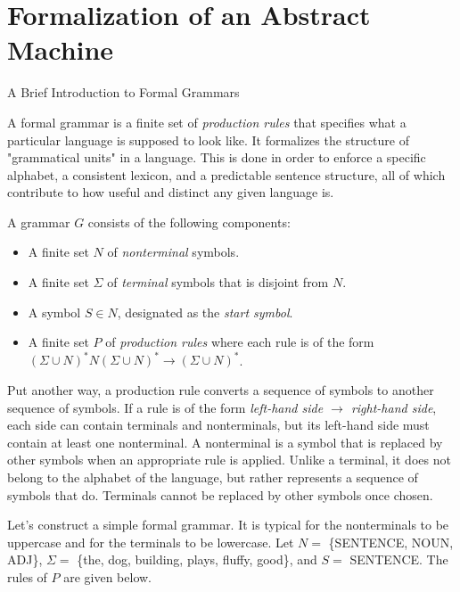 \section{Formalization of an Abstract Machine}

\begin{bluebox}{A Brief Introduction to Formal Grammars}

    A formal grammar is a finite set of \textit{production rules} that specifies what a particular language is supposed to look like. It formalizes the structure of "grammatical units" in a language. This is done in order to enforce a specific alphabet, a consistent lexicon, and a predictable sentence structure, all of which contribute to how useful and distinct any given language is.

    \vspace{4mm}
    A grammar $G$ consists of the following components:
    \begin{itemize}
        \item A finite set $N$ of \textit{nonterminal} symbols.
        \item A finite set $\Sigma$ of \textit{terminal} symbols that is disjoint from $N$.
        \item A symbol $S\in N$, designated as the \textit{start symbol}.
        \item A finite set $P$ of \textit{production rules} where each rule is of the form \\ ${(\Sigma\cup N)^*N(\Sigma\cup N)^*\rightarrow(\Sigma\cup N)^*}$.
    \end{itemize}
    \vspace{4mm}
        
    Put another way, a production rule converts a sequence of symbols to another sequence of symbols. If a rule is of the form \textit{left-hand side $\rightarrow$ right-hand side}, each side can contain terminals and nonterminals, but its left-hand side must contain at least one nonterminal. A nonterminal is a symbol that is replaced by other symbols when an appropriate rule is applied. Unlike a terminal, it does not belong to the alphabet of the language, but rather represents a sequence of symbols that do. Terminals cannot be replaced by other symbols once chosen.
        
    Let's construct a simple formal grammar. It is typical for the nonterminals to be uppercase and for the terminals to be lowercase. Let $N=$ \{SENTENCE, NOUN, ADJ\}, $\Sigma=$ \{the, dog, building, plays, fluffy, good\}, and $S=$ SENTENCE. The rules of $P$ are given below.


\end{bluebox}
